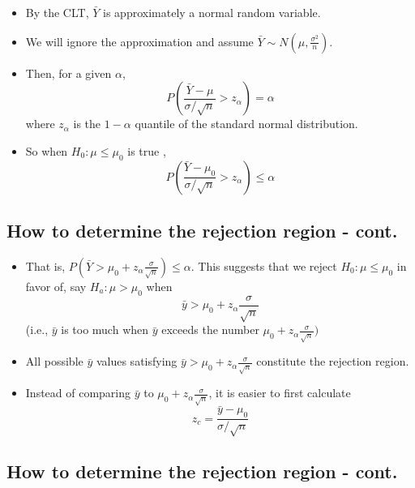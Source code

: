 \documentclass[
  letterpaper,
  DIV=11,
  numbers=noendperiod]{scrartcl}
\begin{document}
\begin{itemize}
\item
  By the CLT, \(\bar{Y}\) is approximately a normal random variable.
\item
  We will ignore the approximation and assume
  \(\bar{Y} \sim N(\mu, \frac{\sigma^2}{n})\).
\item
  Then, for a given \(\alpha\),
  \[P \left( \frac{\bar{Y}-\mu}{\sigma/\sqrt{n}} > z_{\alpha} \right) = \alpha\]
  where \(z_\alpha\) is the \(1-\alpha\) quantile of the standard normal
  distribution.
\item
  So when \(H_0: \mu \leq \mu_0\) is true ,
  \[P \left( \frac{\bar{Y}-\mu_0}{\sigma/\sqrt{n}} > z_{\alpha} \right) \leq \alpha\]
\end{itemize}

\subsection{How to determine the rejection region -
cont.}\label{how-to-determine-the-rejection-region---cont.}

\begin{itemize}
\item
  That is,
  \(P(\bar{Y} > \mu_0 + z_\alpha \frac{\sigma}{\sqrt{n}})\leq \alpha.\)
  This suggests that we reject \(H_0: \mu \leq \mu_0\) in favor of, say
  \(H_a: \mu > \mu_0\) when
  \[\bar{y} > \mu_0 + z_\alpha \frac{\sigma}{\sqrt{n}}\] (i.e.,
  \(\bar{y}\) is {too much} when \(\bar{y}\) exceeds the number
  \(\mu_0 +
   z_\alpha \frac{\sigma}{\sqrt{n}})\)\\
\item
  All possible \(\bar{y}\) values satisfying
  \(\bar{y} > \mu_0 + z_\alpha
  \frac{\sigma}{\sqrt{n}}\) constitute the {rejection} {region}.
\item
  Instead of comparing \(\bar{y}\) to \(\mu_0 + z_\alpha
  \frac{\sigma}{\sqrt{n}}\), it is easier to first calculate
  \[z_c=\frac{\bar{y}-\mu_0}{\sigma/\sqrt{n}}\]
\end{itemize}

\subsection{How to determine the rejection region -
cont.}\label{how-to-determine-the-rejection-region---cont.-1}
\end{document}
